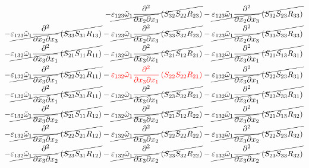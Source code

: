 \begin{equation}
\begin{split}
		-\cancel{\varepsilon_{123}\tilde{\omega}_{1}\pdv{}{x_{2}}{x_{3}}\left(S_{32}S_{22}R_{23}\right)}
		-\cancel{\varepsilon_{123}\tilde{\omega}_{1}\pdv{}{x_{2}}{x_{3}}\left(S_{32}S_{23}R_{33}\right)}\\
		-\cancel{\varepsilon_{123}\tilde{\omega}_{1}\pdv{}{x_{2}}{x_{3}}\left(S_{33}S_{31}R_{13}\right)}
		-\cancel{\varepsilon_{123}\tilde{\omega}_{1}\pdv{}{x_{2}}{x_{3}}\left(S_{33}S_{32}R_{23}\right)}
		-\cancel{\varepsilon_{123}\tilde{\omega}_{1}\pdv{}{x_{2}}{x_{3}}\left(S_{33}S_{33}R_{33}\right)}\\
		-\cancel{\varepsilon_{132}\tilde{\omega}_{1}\pdv{}{x_{3}}{x_{1}}\left(S_{21}S_{11}R_{11}\right)}
		-\cancel{\varepsilon_{132}\tilde{\omega}_{1}\pdv{}{x_{3}}{x_{1}}\left(S_{21}S_{12}R_{21}\right)}
		-\cancel{\varepsilon_{132}\tilde{\omega}_{1}\pdv{}{x_{3}}{x_{1}}\left(S_{21}S_{13}R_{31}\right)}\\
		-\cancel{\varepsilon_{132}\tilde{\omega}_{1}\pdv{}{x_{3}}{x_{1}}\left(S_{22}S_{21}R_{11}\right)}
		-{\color{red}\varepsilon_{132}\tilde{\omega}_{1}\pdv{}{x_{3}}{x_{1}}\left(S_{22}S_{22}R_{21}\right)}
		-\cancel{\varepsilon_{132}\tilde{\omega}_{1}\pdv{}{x_{3}}{x_{1}}\left(S_{22}S_{23}R_{31}\right)}\\
		-\cancel{\varepsilon_{132}\tilde{\omega}_{1}\pdv{}{x_{3}}{x_{1}}\left(S_{23}S_{31}R_{11}\right)}
		-\cancel{\varepsilon_{132}\tilde{\omega}_{1}\pdv{}{x_{3}}{x_{1}}\left(S_{23}S_{32}R_{21}\right)}
		-\cancel{\varepsilon_{132}\tilde{\omega}_{1}\pdv{}{x_{3}}{x_{1}}\left(S_{23}S_{33}R_{31}\right)}\\
		-\cancel{\varepsilon_{132}\tilde{\omega}_{1}\pdv{}{x_{3}}{x_{2}}\left(S_{21}S_{11}R_{12}\right)}
		-\cancel{\varepsilon_{132}\tilde{\omega}_{1}\pdv{}{x_{3}}{x_{2}}\left(S_{21}S_{12}R_{22}\right)}
		-\cancel{\varepsilon_{132}\tilde{\omega}_{1}\pdv{}{x_{3}}{x_{2}}\left(S_{21}S_{13}R_{32}\right)}\\
		-\cancel{\varepsilon_{132}\tilde{\omega}_{1}\pdv{}{x_{3}}{x_{2}}\left(S_{22}S_{21}R_{12}\right)}
		-\cancel{\varepsilon_{132}\tilde{\omega}_{1}\pdv{}{x_{3}}{x_{2}}\left(S_{22}S_{22}R_{22}\right)}
		-\cancel{\varepsilon_{132}\tilde{\omega}_{1}\pdv{}{x_{3}}{x_{2}}\left(S_{22}S_{23}R_{32}\right)}\\
		-\cancel{\varepsilon_{132}\tilde{\omega}_{1}\pdv{}{x_{3}}{x_{2}}\left(S_{23}S_{31}R_{12}\right)}
		-\cancel{\varepsilon_{132}\tilde{\omega}_{1}\pdv{}{x_{3}}{x_{2}}\left(S_{23}S_{32}R_{22}\right)}
		-\cancel{\varepsilon_{132}\tilde{\omega}_{1}\pdv{}{x_{3}}{x_{2}}\left(S_{23}S_{33}R_{32}\right)}\\

\end{split}
\end{equation}
